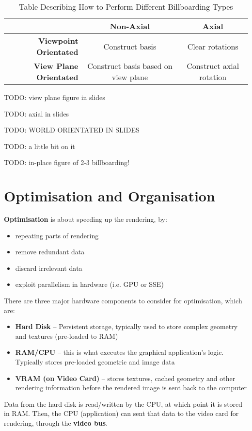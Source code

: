 \documentclass{article}
\begin{document}
\begin{table}[H]
	\centering
	\begin{tabular}{|r|c|c|}
		\hline
		& \textbf{Non-Axial} & \textbf{Axial} \\
		\hline
		\textbf{Viewpoint Orientated} & Construct basis & Clear rotations \\	
		\textbf{View Plane Orientated} & Construct basis based on view plane & Construct axial rotation \\
		\hline
	\end{tabular}
	\caption{Table Describing How to Perform Different Billboarding Types}
	\label{eq:billboard-types}
\end{table}

TODO: view plane figure in slides

TODO: axial in slides

TODO: WORLD ORIENTATED IN SLIDES

TODO: a little bit on it

TODO: in-place figure of 2-3 billboarding!

\section{Optimisation and Organisation}

\textbf{Optimisation} is about speeding up the rendering, by:
\begin{itemize}
	\item repeating parts of rendering
	\item remove redundant data
	\item discard irrelevant data
	\item exploit parallelism in hardware (i.e. GPU or SSE)
\end{itemize}

There are three major hardware components to consider for optimisation, which are:
\begin{itemize}
	\item \textbf{Hard Disk} -- Persistent storage, typically used to store complex geometry and textures (pre-loaded to RAM)
	\item \textbf{RAM/CPU} -- this is what executes the graphical application's logic. Typically stores pre-loaded geometric and image data
	\item \textbf{VRAM (on Video Card)} -- stores textures,  cached geometry and other rendering information before the rendered image is sent back to the computer 
\end{itemize}
Data from the hard disk is read/written by the CPU, at which point it is stored in RAM. Then, the CPU (application) can sent that data to the video card for rendering, through the \textbf{video bus}.
\end{document}

